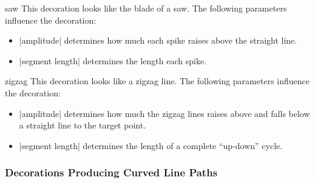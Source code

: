 \begin{decoration}{saw}
  This decoration looks like the blade of a saw. The following parameters
  influence the decoration:
  \begin{itemize}
  \item |amplitude|
    determines how much each spike raises above the straight line.
  \item |segment length|
    determines the length each spike.
  \end{itemize}
\begin{codeexample}[]
\end{codeexample}
\end{decoration}


\begin{decoration}{zigzag}
  This decoration looks like a zigzag line. The following parameters
  influence the decoration:
  \begin{itemize}
  \item |amplitude|
    determines how much the zigzag lines raises above and falls below
    a straight line to the target point.
  \item |segment length|
    determines the length of a complete ``up-down'' cycle.
  \end{itemize}
\begin{codeexample}[]
\end{codeexample}
\end{decoration}



\subsubsection{Decorations Producing Curved Line Paths}

